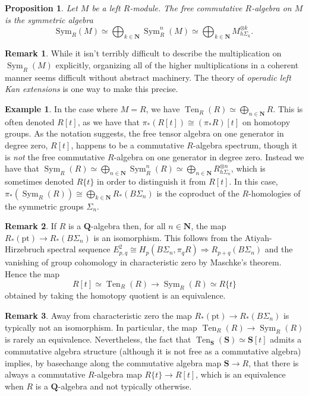 \documentclass[12pt]{article}
\newtheorem{proposition}{Proposition}[subsection]
\theoremstyle{definition}
\newtheorem{example}{Example}[subsection]
\newtheorem{remark}{Remark}[subsection]
\newcommand{\NN}{\mathbf{N}}
\newcommand{\QQ}{\mathbf{Q}}
\renewcommand{\SS}{\mathbf{S}}
\newcommand{\too}{\longrightarrow}
\DeclareMathOperator{\Sym}{Sym}
\DeclareMathOperator{\Ten}{Ten}
\newcommand{\pt}{\mathrm{pt}}
\begin{document}
\begin{proposition}{\em \cite[Example 3.1.3.14]{HA}}
Let $M$ be a left $R$-module.
The free commutative $R$-algebra on $M$ is the symmetric algebra
\[
\mathrm{Sym}_R(M)\simeq\bigoplus_{k\in\NN}\Sym_R^n(M)\simeq\bigoplus_{k\in\NN} M^{\otimes k}_{h\Sigma_k}.
\]
\end{proposition}
\begin{remark}
While it isn't terribly difficult to describe the multiplication on $\Sym_R(M)$ explicitly, organizing all of the higher multiplications in a coherent manner seems difficult without abstract machinery.
The theory of {\em operadic left Kan extensions} \cite{HA} is one way to make this precise.
\end{remark}

\begin{example}
In the case where $M=R$, we have $\Ten_R(R)\simeq\bigoplus_{n\in\NN} R$.
This is often denoted $R[t]$, as we have that $\pi_*(R[t])\cong(\pi_* R)[t]$ on homotopy groups.
As the notation suggests, the free tensor algebra on one generator in degree zero, $R[t]$, happens to be a commutative $R$-algebra spectrum, though it is {\em not} the free commutative $R$-algebra on one generator in degree zero.
Instead we have that $\Sym_R(R)\simeq\bigoplus_{n\in\NN} \Sym^n_R(R)\simeq \bigoplus_{n\in\NN} R^{\otimes n}_{h\Sigma_n}$,
which is sometimes denoted $R\{t\}$ in order to distinguish it from $R[t]$.
In this case, $\pi_*(\Sym_R(R))\cong\bigoplus_{k\in\NN} R_*(B\Sigma_n)$
is the coproduct of the $R$-homologies of the symmetric groups $\Sigma_n$.
\end{example}

\begin{remark}
If $R$ is a $\QQ$-algebra then, for all $n\in\NN$, the map $R_*(\pt)\to R_*(B\Sigma_n)$ is an isomorphism.
This follows from the Atiyah-Hirzebruch spectral sequence $E^2_{p,q}\cong H_p(B\Sigma_n,\pi_q R)\Rightarrow R_{p+q}(B\Sigma_n)$ and the vanishing of group cohomology in characteristic zero by Maschke's theorem.
Hence the map
\[
R[t]\simeq\Ten_R(R)\too\Sym_R(R)\simeq R\{ t\}
\]
obtained by taking the homotopy quotient is an equivalence.
\end{remark}

\begin{remark}
Away from characteristic zero the map $R_*(\pt)\to R_*(B\Sigma_n)$ is typically not an isomorphism.
In particular, the map $\Ten_R(R)\to\Sym_R(R)$ is rarely an equivalence.
Nevertheless, the fact that $\Ten_\SS(\SS)\simeq\SS[t]$ admits a commutative algebra structure (although it is not free as a commutative algebra) implies, by basechange along the commutative algebra map $\SS\to R$, that there is always a commutative $R$-algebra map $R\{t\}\to R[t]$, which is an equivalence when $R$ is a $\QQ$-algebra and not typically otherwise.
\end{remark}
\end{document}
